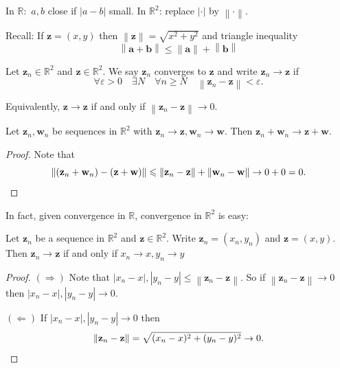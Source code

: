 \documentclass[a4paper,11pt]{article}
\renewcommand{\epsilon}{\varepsilon}
\begin{document}
In $\mathbb{R}:$ $a,b$ close if $|a-b|$ small. In $ \mathbb{R}^{2} $: replace $ |\cdot | $ by $ \left\| \cdot  \right\| $. 

Recall: If $\mathbf{z}=(x,y)$ then $ \left\| \mathbf{z} \right\| = \sqrt{x^2+y^2} $ and triangle inequality
\[
    \left\| \mathbf{a}+\mathbf{b} \right\| \le \left\| \mathbf{a} \right\| + \left\| \mathbf{b} \right\|
\]

\begin{definition}
    Let $\mathbf{z}_n\in \mathbb{R}^{2}$ and $\mathbf{z}\in \mathbb{R}^{2}$. We say $ \mathbf{z}_n $ converges to $\mathbf{z}$ and write $\mathbf{z}_n\to \mathbf{z}$ if 
    \[
        \forall \epsilon>0\quad \exists N\quad \forall n\ge N\quad \left\| \mathbf{z}_n-\mathbf{z} \right\| < \epsilon. 
    \]
\end{definition}
\begin{note}
    Equivalently, $ \mathbf{z}\to \mathbf{z} $ if and only if $ \left\| \mathbf{z}_n-\mathbf{z} \right\|\to 0 $. 
\end{note}

\begin{example}
    Let $ \mathbf{z}_n,\mathbf{w}_n $ be sequences in $ \mathbb{R}^{2} $ with $ \mathbf{z}_n\to \mathbf{z},\mathbf{w}_n\to \mathbf{w} $. Then $ \mathbf{z}_n+\mathbf{w}_n\to \mathbf{z}+\mathbf{w} $. 

    \begin{proof}
        Note that 
        \[
            \left\| (\mathbf{z}_n+\mathbf{w}_n)-(\mathbf{z}+\mathbf{w}) \right\|\le \left\| \mathbf{z}_n-\mathbf{z} \right\| + \left\| \mathbf{w}_n-\mathbf{w} \right\|\to 0+0=0. \qedhere
        \]
    \end{proof}
\end{example}
In fact, given convergence in $\mathbb{R}$, convergence in $ \mathbb{R}^{2} $ is easy: 
\begin{proposition}
    Let $ \mathbf{z}_n $ be a sequence in $ \mathbb{R}^{2} $ and $\mathbf{z}\in \mathbb{R}^{2}$. Write $ \mathbf{z}_n = (x_n,y_n) $ and $\mathbf{z} = (x,y)$. Then $ \mathbf{z}_n\to \mathbf{z} $ if and only if $ x_n\to x,y_n\to y $ 
\end{proposition}
\begin{proof}
    $ (\Rightarrow) $ Note that $ |x_n-x|,|y_n-y|\le \left\| \mathbf{z}_n-\mathbf{z} \right\| $. So if $ \left\| \mathbf{z}_n-\mathbf{z} \right\|\to 0 $ then $ |x_n-x|,|y_n-y|\to 0 $. 

    $ ( \Leftarrow) $ If $ |x_n-x|,|y_n-y|\to 0 $ then 
    \[
        \left\| \mathbf{z}_n-\mathbf{z} \right\| = \sqrt{(x_n-x)^2 + (y_n-y)^2}\to 0.\qedhere
    \]
\end{proof}
\end{document}

